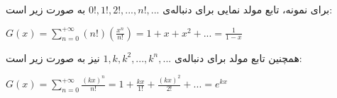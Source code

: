 \p
برای نمونه،
تابع مولد نمایی برای دنباله‌ی 
$0!, 1!, 2!, ..., n!, ...$ 
به صورت زیر است:
\begin{center}
    $G(x)= \sum\limits_{n=0}^{+\infty} (n!)(\frac{x^{n}}{n!}) 
    = 1 + x + x^{2} + ... = \frac{1}{1-x}$		
\end{center}

همچنین تابع مولد برای دنباله‌ی 
$1, k, k^{2}, ..., k^{n}, ...$
نیز به صورت زیر است: 
\begin{center}
    $G(x)= \sum\limits_{n=0}^{+\infty} \frac{(kx)^{n}}{n!} 
    = 1 + \frac{kx}{1!} + \frac{(kx)^{2}}{2!} + ... = e^{kx}$		
\end{center}	